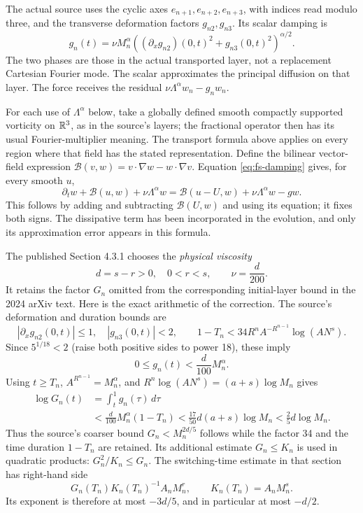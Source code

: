 The actual source uses the cyclic axes $e_{n+1},e_{n+2},e_{n+3}$, with indices
read modulo three, and the transverse deformation factors $g_{n2},g_{n3}$.
Its scalar damping is
\[
 g_n(t)=\nu M_n^\alpha
 \left((\partial_xg_{n2})(0,t)^2+g_{n3}(0,t)^2\right)^{\alpha/2}.
                                                        \tag{FS7}\label{eq:fs-symbol}
\]
The two phases are those in the actual transported layer, not a replacement
Cartesian Fourier mode. The scalar approximates the principal diffusion on
that layer. The force receives the residual
$\nu\Lambda^\alpha w_n-g_nw_n$.

For each use of $\Lambda^\alpha$ below, take a globally defined smooth
compactly supported vorticity on $\mathbb R^3$, as in the source's layers; the
fractional operator then has its usual Fourier-multiplier meaning. The
transport formula above applies on every region where that field has the
stated representation. Define the bilinear vector-field expression
$\mathcal B(v,w)=v\cdot\nabla w-w\cdot\nabla v$.
Equation \eqref{eq:fs-damping} gives, for every smooth $u$,
\[
 \partial_tw+\mathcal B(u,w)+\nu\Lambda^\alpha w
 =\mathcal B(u-U,w)+\nu\Lambda^\alpha w-gw.       \tag{FS8}\label{eq:fs-residual}
\]
This follows by adding and subtracting $\mathcal B(U,w)$ and using its
equation; it fixes both signs. The dissipative term has been incorporated in
the evolution, and only its approximation error appears in this formula.

The published Section 4.3.1 chooses the \emph{physical viscosity}
\[
 d=s-r>0,\quad 0<r<s,\qquad \nu=\frac{d}{200}.
                                                        \tag{FS9}\label{eq:fs-visc}
\]
It retains the factor $G_n$ omitted from the corresponding initial-layer
bound in the 2024 arXiv text. Here is the exact arithmetic of the correction.
The source's deformation and duration bounds are
\[
 |\partial_xg_{n2}(0,t)|\leq1,\quad |g_{n3}(0,t)|<2,
 \qquad
 1-T_n<34R^n A^{-R^{n-1}}\log(AN^s).
                                                        \tag{FS10}\label{eq:fs-duration}
\]
Since $5^{1/18}<2$ (raise both positive sides to power 18), these imply
\[
 0\leq g_n(t)<\frac{d}{100}M_n^\alpha.
\]
Using $t\geq T_n$, $A^{R^{n-1}}=M_n^\alpha$, and
$R^n\log(AN^s)=(a+s)\log M_n$ gives
\begin{align*}
 \log G_n(t)&=\int_t^1g_n(\tau)\,d\tau\\
 &<\frac{d}{100}M_n^\alpha(1-T_n)
 <\frac{17}{50}d(a+s)\log M_n
 <\frac25d\log M_n.
\end{align*}
Thus the source's coarser bound $G_n<M_n^{2d/5}$ follows while the factor 34
and the time duration $1-T_n$ are retained. Its additional estimate
$G_n\leq K_n$ is used in quadratic products: $G_n^2/K_n\leq G_n$.
The switching-time estimate in that section has right-hand side
\[
 G_n(T_n)K_n(T_n)^{-1}A_nM_n^r,
 \qquad K_n(T_n)=A_nM_n^s.
\]
Its exponent is therefore at most $-3d/5$, and in particular at most $-d/2$.

